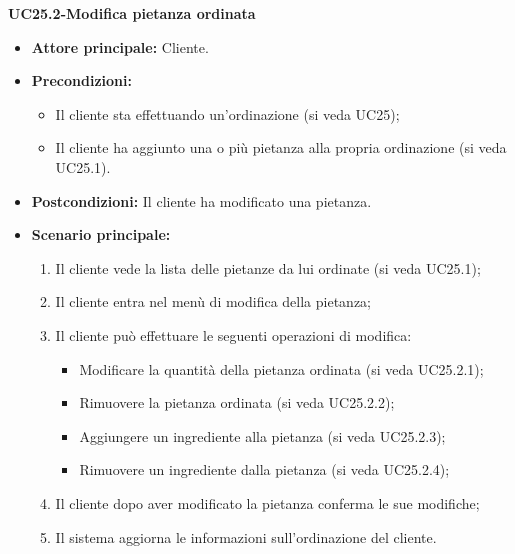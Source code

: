 \textbf{UC25.2-Modifica pietanza ordinata}
\begin{itemize}
\item \textbf{Attore principale:} Cliente.
\item \textbf{Precondizioni:} 
\begin{itemize}
    \item Il cliente sta effettuando un'ordinazione (si veda UC25);
    \item Il cliente ha aggiunto una o più pietanza alla propria ordinazione (si veda UC25.1).
\end{itemize}
\item \textbf{Postcondizioni:} Il cliente ha modificato una pietanza.
\item \textbf{Scenario principale:}
\begin{enumerate}
    \item Il cliente vede la lista delle pietanze da lui ordinate (si veda UC25.1);
    \item Il cliente entra nel menù di modifica della pietanza;
    \item Il cliente può effettuare le seguenti operazioni di modifica:
    \begin{itemize}
        \item Modificare la quantità della pietanza ordinata (si veda UC25.2.1);
        \item Rimuovere la pietanza ordinata (si veda UC25.2.2);
        \item Aggiungere un ingrediente alla pietanza (si veda UC25.2.3);
        \item Rimuovere un ingrediente dalla pietanza (si veda UC25.2.4);
    \end{itemize}
    \item Il cliente dopo aver modificato la pietanza conferma le sue modifiche;
    \item Il sistema aggiorna le informazioni sull'ordinazione del cliente.
\end{enumerate}
\end{itemize}

